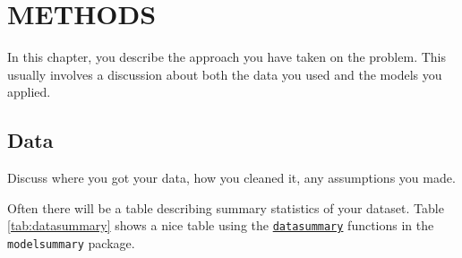\documentclass[3p, authoryear]{elsarticle} %
\begin{document}
\hypertarget{methods}{%
\section{METHODS}\label{methods}}

In this chapter, you describe the approach you have taken on the problem. This
usually involves a discussion about both the data you used and the models you
applied.

\hypertarget{data}{%
\subsection{Data}\label{data}}

Discuss where you got your data, how you cleaned it, any assumptions you made.

Often there will be a table describing summary statistics of your dataset.
Table \ref{tab:datasummary} shows a nice table using the \href{https://vincentarelbundock.github.io/modelsummary/articles/datasummary.html}{\texttt{datasummary}}
functions in the \texttt{modelsummary} package.
\end{document}
